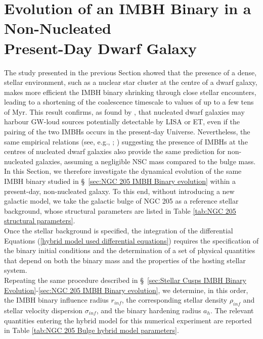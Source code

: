 \documentclass[12pt,twoside,openany]{book}
\begin{document}
\section[Evolution of an IMBH Binary in a Non-Nucleated Present-Day Dwarf Galaxy]
{Evolution of an IMBH Binary in a Non-Nucleated\\Present-Day Dwarf Galaxy
}
\label{sec:Evolution of an IMBH binary in a non nucleated present-day dwarf}
The study presented in the previous Section showed that the presence of a dense, stellar environment, such as a nuclear star cluster at the centre of a dwarf galaxy, makes more efficient the IMBH binary shrinking through close stellar encounters, leading to a shortening of the coalescence timescale to values of up to a few tens of Myr. This result confirms, as found by \textcite{Khan_2021}, that nucleated dwarf galaxies may harbour GW-loud sources potentially detectable by LISA or ET, even if the pairing of the two IMBHs occurs in the present-day Universe. Nevertheless, the same empirical relations (see, e.g., \citealt{Magorrian_1998}; \citealt{Maiolino_2024}) suggesting the presence of IMBHs at the centres of nucleated dwarf galaxies also provide the same prediction for non-nucleated galaxies, assuming a negligible NSC mass compared to the bulge mass. In this Section, we therefore investigate the dynamical evolution of the same IMBH binary studied in \S~\ref{sec:NGC 205 IMBH Binary evolution} within a present-day, non-nucleated galaxy. To this end, without introducing a new galactic model, we take the galactic bulge of NGC 205 as a reference stellar background, whose structural parameters are listed in Table \ref{tab:NGC 205 structural parameters}.\\Once the stellar background is specified, the integration of the differential Equations (\ref{hybrid model used differential equations}) requires the specification of the binary initial conditions and the determination of a set of physical quantities that depend on both the binary mass and the properties of the hosting stellar system.\\Repeating the same procedure described in \S~\ref{sec:Stellar Cusps IMBH Binary Evolution}-\ref{sec:NGC 205 IMBH Binary evolution}, we determine, in this order, the IMBH binary influence radius $r_{inf}$, the corresponding stellar density $\rho_{inf}$ and stellar velocity dispersion $\sigma_{inf}$, and the binary hardening radius $a_h$. The relevant quantities entering the hybrid model for this numerical experiment are reported in Table \ref{tab:NGC 205 Bulge hybrid model parameters}.
\end{document}

